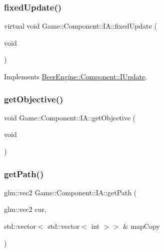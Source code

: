 \mbox{\label{class_game_1_1_component_1_1_i_a_a72b1e3aaf4686e0abef2e147d48f50e9}} 
\subsubsection{\texorpdfstring{fixed\+Update()}{fixedUpdate()}}
{\footnotesize\ttfamily virtual void Game\+::\+Component\+::\+I\+A\+::fixed\+Update (\begin{DoxyParamCaption}\item[{void}]{ }\end{DoxyParamCaption})\hspace{0.3cm}{\ttfamily [virtual]}}



Implements \mbox{\hyperlink{class_beer_engine_1_1_component_1_1_i_update_a615c127a4729f73713e5eaeee538854b}{Beer\+Engine\+::\+Component\+::\+I\+Update}}.

\mbox{\label{class_game_1_1_component_1_1_i_a_a01c2575295fff1a6c3c0314d4edc0266}} 
\subsubsection{\texorpdfstring{get\+Objective()}{getObjective()}}
{\footnotesize\ttfamily void Game\+::\+Component\+::\+I\+A\+::get\+Objective (\begin{DoxyParamCaption}\item[{void}]{ }\end{DoxyParamCaption})\hspace{0.3cm}{\ttfamily [protected]}}

\mbox{\label{class_game_1_1_component_1_1_i_a_addb635c6c68490214abd843fd07fdb12}} 
\subsubsection{\texorpdfstring{get\+Path()}{getPath()}}
{\footnotesize\ttfamily glm\+::vec2 Game\+::\+Component\+::\+I\+A\+::get\+Path (\begin{DoxyParamCaption}\item[{glm\+::vec2}]{cur,  }\item[{std\+::vector$<$ std\+::vector$<$ int $>$$>$ \&}]{map\+Copy }\end{DoxyParamCaption})\hspace{0.3cm}{\ttfamily [protected]}}

